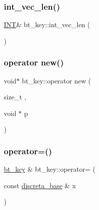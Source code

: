 \mbox{\label{classbt__key_ac8e43906f79bacf330fa1726925b7e37}} 
\subsubsection{\texorpdfstring{int\+\_\+vec\+\_\+len()}{int\_vec\_len()}}
{\footnotesize\ttfamily \mbox{\hyperlink{galois_8h_a09fddde158a3a20bd2dcadb609de11dc}{I\+NT}}\& bt\+\_\+key\+::int\+\_\+vec\+\_\+len (\begin{DoxyParamCaption}{ }\end{DoxyParamCaption})\hspace{0.3cm}{\ttfamily [inline]}}

\mbox{\label{classbt__key_adb8126830e966050ea93d1b2c32c0d07}} 
\subsubsection{\texorpdfstring{operator new()}{operator new()}}
{\footnotesize\ttfamily void$\ast$ bt\+\_\+key\+::operator new (\begin{DoxyParamCaption}\item[{size\+\_\+t}]{,  }\item[{void $\ast$}]{p }\end{DoxyParamCaption})\hspace{0.3cm}{\ttfamily [inline]}}

\mbox{\label{classbt__key_a5258ebd54987d2152544e63a34c2bc2a}} 
\subsubsection{\texorpdfstring{operator=()}{operator=()}}
{\footnotesize\ttfamily \mbox{\hyperlink{classbt__key}{bt\+\_\+key}} \& bt\+\_\+key\+::operator= (\begin{DoxyParamCaption}\item[{const \mbox{\hyperlink{classdiscreta__base}{discreta\+\_\+base}} \&}]{x }\end{DoxyParamCaption})}

